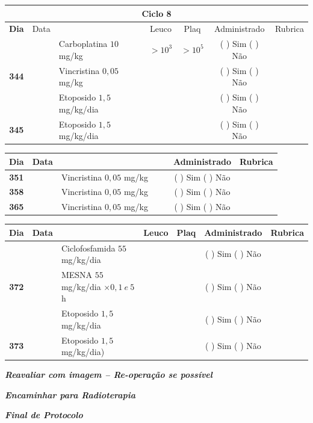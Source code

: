 \documentclass[11pt,a4paper,oldfontcommands]{memoir}
\begin{document}
\begin{center}
\begin{longtable}{p{1cm}c|p{5cm}|p{1.5cm}p{1.5cm}|c|c}
	\hline
	\multicolumn{7}{c}{Ciclo 8} \\
	\hline
	\multicolumn{1}{c|}{\multirow{1}{*}{\textbf{Dia}}}&{Data}&{}&\multicolumn{1}{c|}{Leuco}&\multicolumn{1}{c|}{Plaq}&{Administrado}&{Rubrica} \\
    \hline
    \multicolumn{1}{c|}{\multirow{3}{*}{\textbf{344}}}&\multirow{2}{*}{}&{Carboplatina \(10\) mg/kg}&\multicolumn{1}{c|}{\(>10^3\)}&\multicolumn{1}{c|}{\(>10^5\)}&{(  ) Sim (  ) Não}&\\
    \cline{4-5}
    \multicolumn{1}{c|}{}&&{Vincristina \(0,05\) mg/kg}&\multicolumn{1}{c|}{}&&{(  ) Sim (  ) Não}&\\
    \cline{4-5}
    \multicolumn{1}{c|}{}&\multirow{1}{*}{}&{Etoposido \(1,5\) mg/kg/dia}&{}&&{(  ) Sim (  ) Não}&\\
    \cline{1-3}\cline{6-6}
    \multicolumn{1}{c|}{\textbf{345}}&\multirow{1}{*}{}&{Etoposido \(1,5\) mg/kg/dia}&{}&&{(  ) Sim (  ) Não}&\\
    \hline
\end{longtable}
\begin{longtable}{p{1cm}c|p{4cm}|p{2cm}p{2cm}|c|c}
	\hline
	\multicolumn{1}{c|}{\multirow{1}{*}{\textbf{Dia}}}&{Data}&{}&{}&&{Administrado}&{Rubrica} \\
    \hline
    \multicolumn{1}{c|}{\textbf{351}}&&{Vincristina \(0,05\) mg/kg}&\multicolumn{1}{c}{}&&{(  ) Sim (  ) Não}&\\
    \hline
    \multicolumn{1}{c|}{\textbf{358}}&&{Vincristina \(0,05\) mg/kg}&\multicolumn{1}{c}{}&&{(  ) Sim (  ) Não}&\\
    \hline
    \multicolumn{1}{c|}{\textbf{365}}&&{Vincristina \(0,05\) mg/kg}&\multicolumn{1}{c}{}&&{(  ) Sim (  ) Não}&\\
    \hline
\end{longtable}

\begin{longtable}{p{1cm}c|p{5cm}|p{1.5cm}p{1.5cm}|c|c}
	\hline
	\multicolumn{1}{c|}{\multirow{1}{*}{\textbf{Dia}}}&{Data}&{}&\multicolumn{1}{c|}{Leuco}&\multicolumn{1}{c|}{Plaq}&{Administrado}&{Rubrica} \\
    \hline
    \multicolumn{1}{c|}{\multirow{3}{*}{\textbf{372}}}&&{Ciclofosfamida \(55\) mg/kg/dia}&\multicolumn{1}{c|}{}&&{(  ) Sim (  ) Não}&\\
    \cline{4-5}
    \multicolumn{1}{c|}{}&&{MESNA \(55\) mg/kg/dia \(\times 0,1 \:e\: 5\)h}&&&{(  ) Sim (  ) Não}&\\
    \multicolumn{1}{c|}{}&&{Etoposido \(1,5\) mg/kg/dia}&&&{(  ) Sim (  ) Não}&\\
    \hline
    \multicolumn{1}{c|}{\multirow{1}{*}{\textbf{373}}}&&{Etoposido \(1,5\) mg/kg/dia)}&{}&&{(  ) Sim (  ) Não}&\\
    \hline
\end{longtable}
\textit{\textbf{Reavaliar com imagem – Re-operação se possível}}

\textit{\textbf{Encaminhar para Radioterapia}}

\textit{\textbf{Final de Protocolo}}
\end{center}
\end{document}
